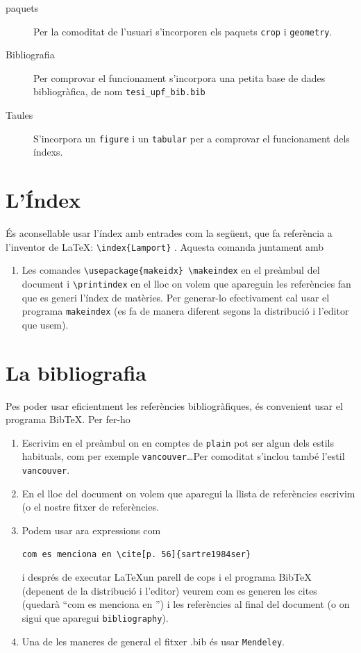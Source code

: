 \documentclass[12pt, a4paper,twoside]{tesi_upf}
\begin{document}
\begin{description}
\item[paquets] Per la comoditat de l'usuari s'incorporen els paquets {\tt crop} i {\tt geometry}. 

\item[Bibliografia] Per comprovar el funcionament s'incorpora una petita base de dades bibliogràfica, de nom \verb+tesi_upf_bib.bib+


\item[Taules] S'incorpora un \verb+figure+ i un \verb+tabular+ per a comprovar el funcionament dels índexs.

\end{description}


\section*{L'Índex}

És aconsellable usar l'índex amb entrades com la següent, que fa referència a l'inventor de \LaTeX:  \verb+\index{Lamport}+ . Aquesta comanda juntament amb
\begin{enumerate}
\item Les comandes \verb+\usepackage{makeidx} \makeindex+ en el preàmbul del document i \verb+\printindex+ en el lloc on volem que apareguin les referències fan que es generi l'índex de matèries. Per generar-lo efectivament cal usar el programa \verb+makeindex+ (es fa de manera diferent segons la distribució i l'editor que usem).
\end{enumerate}

\section*{La bibliografia}
Pes poder usar eficientment les referències bibliogràfiques, és convenient usar el programa BibTeX. Per fer-ho 
\begin{enumerate}
\item Escrivim en el preàmbul \verb++ on en comptes de \verb+plain+ pot ser algun dels estils habituals, com per exemple \verb+vancouver+\ldots Per comoditat s'inclou també l'estil \verb+vancouver+.

\item En el lloc del document on volem que aparegui la llista de referències escrivim \verb+ + (o el nostre fitxer de referències.

\item Podem usar ara expressions com 
\begin{verbatim} 
com es menciona en \cite[p. 56]{sartre1984ser}
\end{verbatim}
 i després de executar \LaTeX un parell de cops i el programa BibTeX (depenent de la distribució i l'editor) veurem com es generen les cites (quedarà ``com es menciona en \cite[p. 56]{sartre1984ser}'') i les referències al final del document (o on sigui que aparegui \verb+bibliography+).


\item Una de les maneres de general el fitxer .bib és usar \verb+Mendeley+.

\end{enumerate}
\end{document}
